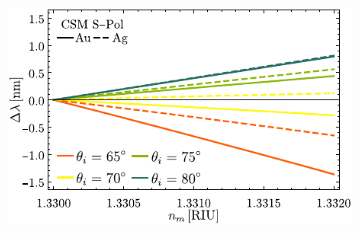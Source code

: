 \begin{figure}[h!]
	\begin{subfigure}{.01\linewidth}\caption{}\label{sfig:FoMCSMs}\vspace{4.5cm}\end{subfigure}\hspace*{-1.em}
	\begin{subfigure}{.45\linewidth}\centering
	\includegraphics[scale=1]{2-Resultados/figs/11-SPPCSM/6_Sens_h20_CSMS.pdf}\end{subfigure}\vspace*{-.5em}
	\caption{ }\label{fig:FoMSPPCSM}
	\end{figure}	












